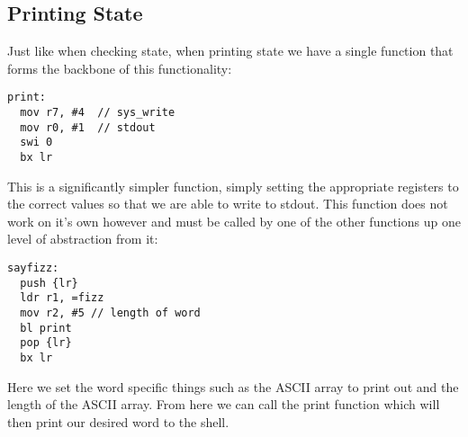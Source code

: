 \documentclass[11pt]{scrartcl}
\begin{document}
\subsection*{Printing State}
Just like when checking state, when printing state we have a single function
that forms the backbone of this functionality:
\begin{verbatim}
print:
  mov r7, #4  // sys_write
  mov r0, #1  // stdout
  swi 0
  bx lr
\end{verbatim}
This is a significantly simpler function, simply setting the appropriate
registers to the correct values so that we are able to write to stdout.
This function does not work on it's own however and must be called by one
of the other functions up one level of abstraction from it:
\begin{verbatim}
sayfizz:
  push {lr}
  ldr r1, =fizz
  mov r2, #5 // length of word
  bl print
  pop {lr}
  bx lr
\end{verbatim}
Here we set the word specific things such as the ASCII array to print out
and the length of the ASCII array. From here we can call the print function
which will then print our desired word to the shell.
\end{document}
